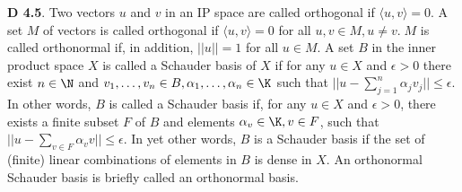 {\bf D 4.5}. Two vectors $u$ and $v$ in an IP space are called orthogonal if $\langle u,v \rangle=0$. A set $M$ of vectors is called orthogonal if $\langle u,v \rangle=0$ for all $u,v \in M, u \neq v. \; M$ is called orthonormal if, in addition, $||u||=1$ for all $u \in M$. A set $B$ in the inner product space $X$ is called a Schauder basis of $X$ if for any $u \in X$ and $\epsilon >0$ there exist $n \in \N$ and $v_1, \dots, v_n \in B, \alpha_1, \dots, \alpha_n \in \K$ such that $||u-\sum_{j=1}^n\alpha_jv_j||\leq \epsilon$. In other words, $B$ is called a Schauder basis if, for any $u \in X$ and $\epsilon >0$, there exists a finite subset $F$ of $B$ and elements $\alpha_v\in \K, v \in F$, such that $||u-\sum_{v \in F}\alpha_vv||\leq \epsilon$.  In yet other words, $B$ is a Schauder basis if the set of (finite) linear combinations of elements in $B$ is dense in $X$. An orthonormal Schauder basis is briefly called an orthonormal basis. 